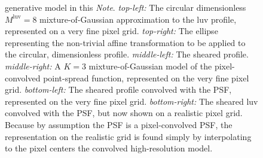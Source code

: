\documentclass[12pt,pdftex,preprint]{aastex}
\newcommand{\documentname}{\textsl{Note}}
\newcommand{\luv}{\mathrm{luv}}
\begin{document}
\begin{figure}
{  generative model in this \documentname.  \textsl{top-left:} The
  circular dimensionless $M^{\luv}=8$ mixture-of-Gaussian
  approximation to the luv profile, represented on a very fine pixel
  grid. \textsl{top-right:} The ellipse representing the non-trivial
  affine transformation to be applied to the circular, dimensionless
  profile.  \textsl{middle-left:} The sheared profile.
  \textsl{middle-right:} A $K=3$ mixture-of-Gaussian model of the
  pixel-convolved point-spread function, represented on the very fine
  pixel grid.  \textsl{bottom-left:} The sheared profile convolved
  with the PSF, represented on the very fine pixel grid.
  \textsl{bottom-right:} The sheared luv convolved with the PSF, but
  now shown on a realistic pixel grid.  Because by assumption the PSF
  is a pixel-convolved PSF, the representation on the realistic grid
  is found simply by interpolating to the pixel centers the convolved
  high-resolution model.\label{fig:example}}
\end{figure}
\end{document}
